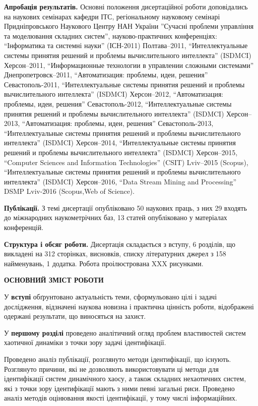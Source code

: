 \documentclass[a4paper,13pt]{atuaref}
\newcommand{\xsect}[1]{\medskip\begin{center}\textbf{#1}\end{center}\medskip\penalty10000}
\begin{document}
\smallskip
\textbf{Апробація результатів.}
Основні положення дисертаційної роботи доповідались на наукових
семінарах кафедри ІТС,
регіональному науковому семінарі Придніпровського Наукового Центру НАН України
''Сучасні проблеми управління та моделювання складних систем'',
науково-практичних конференціях:
``Інформатика та системні науки'' (ІСН-2011) Полтава--2011,
``Интеллектуальные системы принятия решений и проблемы вычислительного интеллекта'' (ISDMCI) Херсон--2011,
``Информационные технологии в управлении сложными системами'' Днепропетровск--2011,
``Автоматизация: проблемы, идеи, решения'' Севастополь-2011,
``Интеллектуальные системы принятия решений и проблемы вычислительного интеллекта'' (ISDMCI) Херсон--2012,
``Автоматизация: проблемы, идеи, решения'' Севастополь-2012,
``Интеллектуальные системы принятия решений и проблемы вычислительного интеллекта'' (ISDMCI) Херсон--2013,
``Автоматизация: проблемы, идеи, решения'' Севастополь-2013,
``Интеллектуальные системы принятия решений и проблемы вычислительного интеллекта'' (ISDMCI) Херсон--2014,
``Интеллектуальные системы принятия решений и проблемы вычислительного интеллекта'' (ISDMCI) Херсон--2015,
``Computer Sciences and Information Technologies'' (CSIT) Lviv--2015 (Scopus),
``Интеллектуальные системы принятия решений и проблемы вычислительного интеллекта'' (ISDMCI) Херсон--2016,
``Data Stream Mining and Processing'' DSMP Lviv-2016 (Scopus,Web of Science).

\smallskip
\textbf{Публікації.}
З темі дисертації опубліковано
50 наукових праць,
з них
29 входять до міжнародних наукометрічних баз,
13 статей опубліковано у матеріалах конференцій.

\smallskip
\textbf{Структура і обсяг роботи.}
Дисертація складається з вступу, 6 розділів, що викладені на
312 сторінках, висновків, списку літературних джерел з
158 найменувань,
1 додатка.
Робота проілюстрована XXX рисунками.


\xsect{ОСНОВНИЙ ЗМІСТ РОБОТИ}

У \textbf{вступі} обґрунтовано актуальність теми,
сформульовано цілі і задачі дослідження,
відзначені наукова новизна і практична цінність роботи, відображені
одержані результати, що виносяться на захист.

У \textbf{першому розділі}
проведено аналітичний огляд проблем
властивостей систем хаотичної динаміки
з точки зору задачі ідентифікації.

Проведено аналіз публікації, розглянуто методи ідентифікації, що існують.
Розглянуто причини, які не дозволяють використовувати ці методи для
ідентифікації систем динамічного хаосу, а також складних нехаотичних систем, які
з точки зору ідентифікації мають з ними певні загальні риси.  Проведено аналіз
методів оцінювання якості ідентифікації, у тому числі інформаційних.
\end{document}
